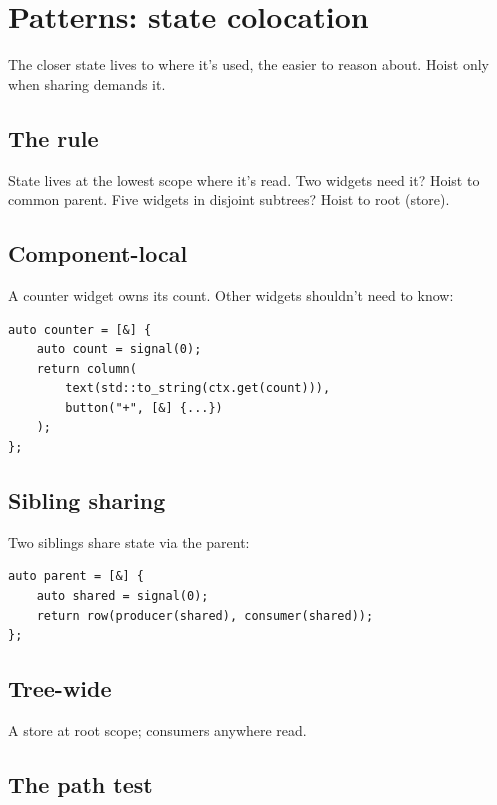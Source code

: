 \chapter{Patterns: state colocation}
\label{ch:colocation}

\begin{aside}
The closer state lives to where it's used, the easier to
reason about. Hoist only when sharing demands it.
\end{aside}

\section{The rule}

State lives at the lowest scope where it's read. Two
widgets need it? Hoist to common parent. Five widgets in
disjoint subtrees? Hoist to root (store).

\section{Component-local}

A counter widget owns its count. Other widgets shouldn't
need to know:

\begin{lstlisting}
auto counter = [&] {
    auto count = signal(0);
    return column(
        text(std::to_string(ctx.get(count))),
        button("+", [&] {...})
    );
};
\end{lstlisting}

\section{Sibling sharing}

Two siblings share state via the parent:

\begin{lstlisting}
auto parent = [&] {
    auto shared = signal(0);
    return row(producer(shared), consumer(shared));
};
\end{lstlisting}

\section{Tree-wide}

A store at root scope; consumers anywhere read.

\section{The path test}


